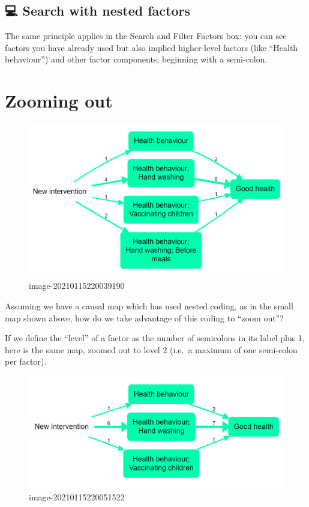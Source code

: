 \documentclass[
]{book}
\begin{document}
\hypertarget{search-with-nested-factors}{%
\section{💻 Search with nested factors}\label{search-with-nested-factors}}

The same principle applies in the Search and Filter Factors box: you can see factors you have already used but also implied higher-level factors (like ``Health behaviour'') and other factor components, beginning with a semi-colon.

\hypertarget{zooming-out}{%
\chapter{Zooming out}\label{zooming-out}}

\begin{figure}
\centering
\includegraphics{_assets/image-20210115220039190.png}
\caption{image-20210115220039190}
\end{figure}

Assuming we have a causal map which has used nested coding, as in the small map shown above, how do we take advantage of this coding to ``zoom out''?

If we define the ``level'' of a factor as the number of semicolons in its label plus 1, here is the same map, zoomed out to level 2 (i.e.~a maximum of one semi-colon per factor).

\begin{figure}
\centering
\includegraphics{_assets/image-20210115220051522.png}
\caption{image-20210115220051522}
\end{figure}
\end{document}
